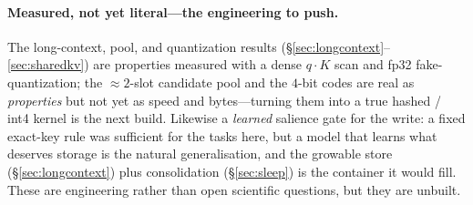 \paragraph{Measured, not yet literal---the engineering to push.} The long-context, pool,
and quantization results (\S\ref{sec:longcontext}--\ref{sec:sharedkv}) are properties
measured with a dense $q\!\cdot\!K$ scan and fp32 fake-quantization; the $\approx\!2$-slot
candidate pool and the $4$-bit codes are real as \emph{properties} but not yet as speed and
bytes---turning them into a true hashed / int4 kernel is the next build. Likewise a
\emph{learned} salience gate for the write: a fixed exact-key rule was sufficient for the
tasks here, but a model that learns what deserves storage is the natural generalisation, and
the growable store (\S\ref{sec:longcontext}) plus consolidation (\S\ref{sec:sleep}) is the
container it would fill. These are engineering rather than open scientific questions, but
they are unbuilt.
